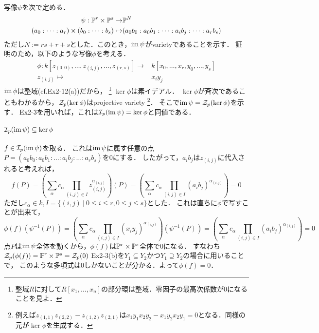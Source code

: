 \documentclass[a4paper]{jarticle}
\begin{document}
\section{} %
    写像$\psi$を次で定める．
    \begin{align*}
        \psi: \mathbb{P}^r \times \mathbb{P}^s \to& \mathbb{P}^N \\
        (a_0: \dots: a_r) \times (b_0: \dots: b_s) \mapsto& (a_0 b_0: a_0 b_1: \dots: a_i b_j: \dots: a_r b_s)
    \end{align*}
    ただし$N:=rs+r+s$とした．このとき，$\operatorname{im} \psi$がvarietyであることを示す．
    証明のため，以下のような写像$\phi$を考える．
    \begin{align*}
        \phi: k[z_{(0,0)}, \dots, z_{(i,j)}, \dots, z_{(r,s)}] \to& k[x_0, \dots, x_r, y_0, \dots, y_s] \\
        z_{(i,j)} \mapsto& x_i y_j
    \end{align*}
    $\operatorname{im} \phi$は整域(cf.Ex2-12(a))だから，
    \footnote{整域$R$に対して$R[x_1,\dots,x_n]$の部分環は整域．零因子の最高次係数が0になることを見よ．}
    $\ker \phi$は素イデアル．
    $\ker \phi$が斉次であることもわかるから，$\mathcal{Z}_p(\ker \phi)$はprojective variety
    \footnote{例えば$z_{(1,1)}z_{(2,2)}-z_{(1,2)}z_{(2,1)}$は$x_1y_1x_2y_2-x_1y_2x_2y_1=0$となる．同様の元が$\ker \phi$を生成する．}．
    そこで$\operatorname{im} \psi = \mathcal{Z}_p(\ker \phi)$を示す．
    Ex2-3を用いれば，これは$\mathcal{I}_p(\operatorname{im} \psi) = \ker \phi$と同値である．

    \paragraph{$\mathcal{I}_p(\operatorname{im} \psi) \subseteq \ker \phi$}
    $f \in \mathcal{I}_p(\operatorname{im} \psi)$を取る．
    これは$\operatorname{im} \psi$に属す任意の点$P=(a_0 b_0: a_0 b_1: \dots: a_i b_j: \dots: a_r b_s)$を0にする．
    したがって，$a_i b_j$は$z_{(i,j)}$に代入されると考えれば，
    \[
        f(P)
        =\left( \sum_{\alpha}{c_{\alpha} \prod_{(i,j) \in I}{z_{(i,j)}^{\alpha_{(i,j)}}}} \right)(P)
        =\left( \sum_{\alpha}{c_{\alpha} \prod_{(i,j) \in I}{(a_i b_j)^{\alpha_{(i,j)}}}} \right)
        =0
    \]
    ただし$c_{\alpha} \in k, I=\{(i,j) ~|~ 0 \leq i \leq r, 0 \leq j \leq s\}$とした．
    これは直ちに$\phi$で写すことが出来て，
    \[
        \phi(f)(\psi^{-1}(P))
        =\left( \sum_{\alpha}{c_{\alpha} \prod_{(i,j) \in I}{(x_i y_j)^{\alpha_{(i,j)}}}} \right)(\psi^{-1}(P))
        =\left( \sum_{\alpha}{c_{\alpha} \prod_{(i,j) \in I}{(a_i b_j)^{\alpha_{(i,j)}}}} \right)
        =0
    \]
    点$P$は$\operatorname{im} \psi$全体を動くから，$\phi(f)$は$\mathbb{P}^r \times \mathbb{P}^s$全体で0になる．
    すなわち$\mathcal{Z}_p(\phi(f))=\mathbb{P}^r \times \mathbb{P}^s=\mathcal{Z}_p(0)$
    Ex2-3(b)を$Y_1 \subseteq Y_2$かつ$Y_1 \supseteq Y_2$の場合に用いることで，
    このような多項式は0しかないことが分かる．よって$\phi(f)=0$．
\end{document}
